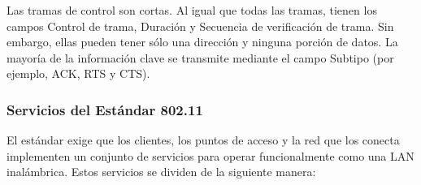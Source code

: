 Las tramas de control son cortas. Al igual que todas las tramas, tienen los campos Control de trama, Duración y Secuencia de verificación de trama. Sin embargo, ellas pueden tener sólo una dirección y ninguna porción de datos. La mayoría de la información clave se transmite mediante el campo Subtipo
(por ejemplo, ACK, RTS y CTS).

\subsubsection{Servicios del Estándar 802.11}

El estándar exige que los clientes, los puntos de acceso y la red que los conecta implementen un conjunto de servicios para operar funcionalmente como una LAN inalámbrica. Estos servicios se dividen de la siguiente manera:

